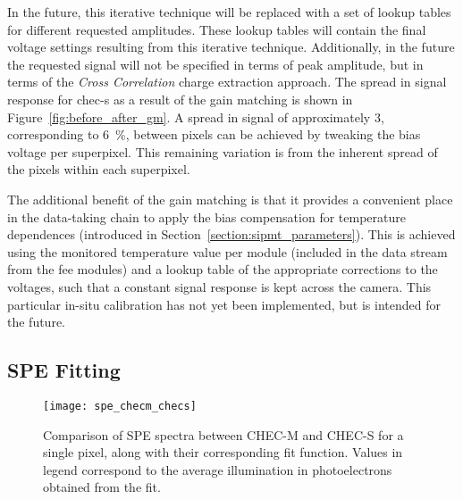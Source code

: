 In the future, this iterative technique will be replaced with a set of lookup tables for different requested amplitudes. These lookup tables will contain the final voltage settings resulting from this iterative technique. Additionally, in the future the requested signal will not be specified in terms of peak amplitude, but in terms of the \textit{Cross Correlation} charge extraction approach. The spread in signal response for \gls{chec-s} as a result of the gain matching is shown in Figure~\ref{fig:before_after_gm}. A spread in signal of approximately \SI{3}{\pe}, corresponding to \SI{6}{\percent}, between pixels can be achieved by tweaking the bias voltage per superpixel. This remaining variation is from the inherent spread of the pixels within each superpixel.

The additional benefit of the gain matching is that it provides a convenient place in the data-taking chain to apply the bias compensation for temperature dependences (introduced in Section~\ref{section:sipmt_parameters}). This is achieved using the monitored temperature value per module (included in the data stream from the \gls{fee} modules) and a lookup table of the appropriate corrections to the voltages, such that a constant signal response is kept across the camera. This particular in-situ calibration has not yet been implemented, but is intended for the future.

\subsection{SPE Fitting}

\begin{figure}
	\centering
    \texttt{[image: spe\_checm\_checs]} 
	\caption[Comparison of SPE spectra between CHEC-M and CHEC-S.]{Comparison of SPE spectra between CHEC-M and CHEC-S for a single pixel, along with their corresponding fit function. Values in legend correspond to the average illumination in photoelectrons obtained from the fit.} 
	\label{fig:spe_checm_checs}
\end{figure}

